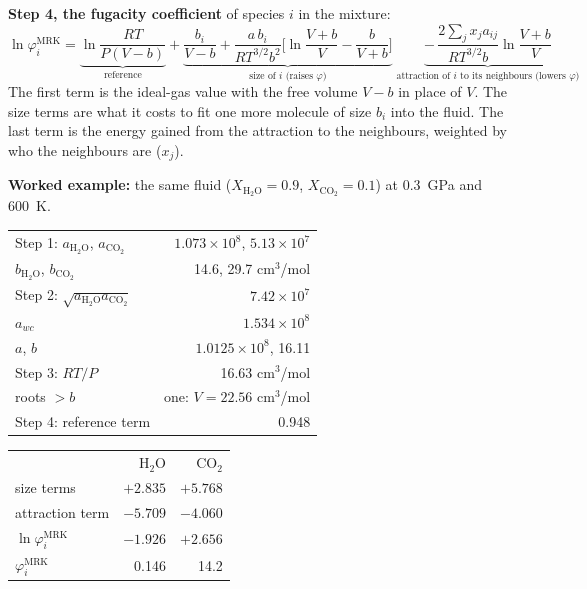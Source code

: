 \documentclass[11pt]{article}
\begin{document}
{\begin{minipage}[t]{0.60\linewidth}
\textbf{Step 4, the fugacity coefficient} of species $i$ in the mixture:
\begin{equation}
  \ln\varphi_i^{\mathrm{MRK}}=\underbrace{\ln\frac{RT}{P(V-b)}}_{\text{reference}}
  +\underbrace{\frac{b_i}{V-b}+\frac{a\,b_i}{RT^{3/2}b^2}\Big[\ln\frac{V+b}{V}-\frac{b}{V+b}\Big]}_{\text{size of }i\text{ (raises }\varphi)}
  \;\underbrace{-\,\frac{2\sum_jx_ja_{ij}}{RT^{3/2}b}\ln\frac{V+b}{V}}_{\text{attraction of }i\text{ to its neighbours (lowers }\varphi)}
\end{equation}
The first term is the ideal-gas value with the free volume $V-b$ in place of $V$. The size terms are what it costs to fit one more molecule of size $b_i$ into the fluid. The last term is the energy gained from the attraction to the neighbours, weighted by who the neighbours are ($x_j$).
\end{minipage}\hfill
\begin{minipage}[t]{0.37\linewidth}
\textbf{Worked example:} the same fluid ($X_{\mathrm{H_2O}}=0.9$, $X_{\mathrm{CO_2}}=0.1$) at 0.3~GPa and 600~K.

\smallskip
\begin{tabular}{@{}l r@{}}
  Step 1: $a_{\mathrm{H_2O}}$, $a_{\mathrm{CO_2}}$      & $1.073\times10^8$, $5.13\times10^7$ \\
  \quad $b_{\mathrm{H_2O}}$, $b_{\mathrm{CO_2}}$        & 14.6, 29.7 cm$^3$/mol               \\
  Step 2: $\sqrt{a_{\mathrm{H_2O}}a_{\mathrm{CO_2}}}$  & $7.42\times10^7$                    \\
  \quad $a_{wc}$                                       & $1.534\times10^8$                   \\
  \quad $a$, $b$                                       & $1.0125\times10^8$, 16.11           \\
  Step 3: $RT/P$                                       & 16.63 cm$^3$/mol                    \\
  \quad roots $>b$                                     & one: $V=22.56$ cm$^3$/mol           \\
  Step 4: reference term                               & 0.948                               \\
\end{tabular}

\smallskip
\begin{tabular}{@{}l r r@{}}
                                        & H$_2$O   & CO$_2$   \\
  size terms                            & $+2.835$ & $+5.768$ \\
  attraction term                       & $-5.709$ & $-4.060$ \\
  $\ln\varphi_i^{\mathrm{MRK}}$         & $-1.926$ & $+2.656$ \\
  $\varphi_i^{\mathrm{MRK}}$            & 0.146    & 14.2     \\
\end{tabular}


\end{minipage}}
\end{document}
